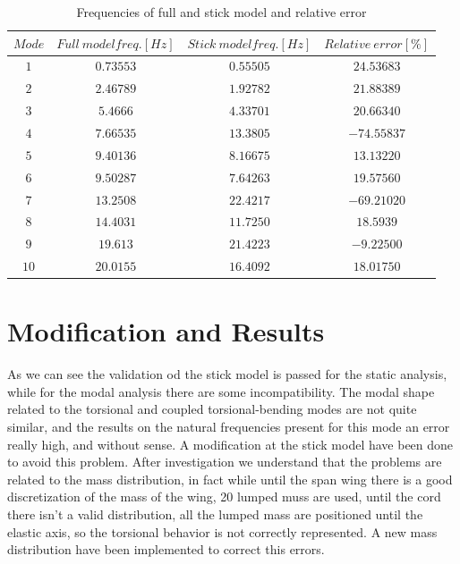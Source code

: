 \begin{table}
\begin{tabular}{cccc}
	\toprule
	$Mode $  &  $Full\  model freq. [Hz]$  &  $Stick\  model freq. [Hz]$ & $Relative \ error [\%]$ \\
	\midrule
	$1$  &  $0.73553$  &  $0.55505$ & $ 24.53683 $\\
	$2$  &  $2.46789$  &  $1.92782$ & $ 21.88389 $\\
	$3$  &  $5.4666$  &  $4.33701$  &$  20.66340$\\
	$4$  &  $7.66535$  &  $13.3805$ &$ -74.55837 $  \\
	$5$  &  $9.40136$  &  $8.16675$  &$ 13.13220 $\\
	$6$  &  $9.50287$  &  $7.64263$  &$ 19.57560 $\\
	$7$  &  $13.2508$  &  $22.4217$  &$ -69.21020  $\\
	$8$  &  $14.4031$  &  $11.7250$  &$ 18.5939 $\\
	$9$  &  $19.613$  &  $21.4223$  &$ -9.22500 $\\
	$10$  &  $20.0155$  & $16.4092$ &$ 18.01750 $ \\
	\bottomrule
\end{tabular}
	\caption{Frequencies of full and stick model and relative error}
		\label{tab:t1}
\end{table} 
\section{Modification and Results}
As we can see the validation od the stick model is passed for the static analysis, while for the modal analysis there are some incompatibility. The modal shape related to the torsional and coupled torsional-bending modes are not quite similar, and the results on the natural frequencies present for this mode an error really high, and without sense. A modification at the stick model have been done to avoid this problem. After investigation we understand that the problems are related to the mass distribution, in fact while until the span wing there is a good discretization of the mass of the wing, 20 lumped muss are used, until the cord there isn't a valid distribution, all the lumped mass are positioned until the elastic axis, so the torsional behavior is not correctly represented. A new mass distribution have been implemented to correct this errors.
